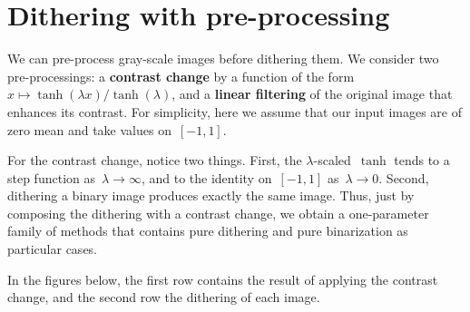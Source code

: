 
\section{Dithering with pre-processing}

We can pre-process gray-scale images before dithering them.  We consider two
pre-processings: a {\bf contrast change} by a function of the
form~$x\mapsto\tanh(\lambda x)/\tanh(\lambda)$, and a {\bf linear filtering}
of the original image that enhances its contrast.  For simplicity, here we
assume that our input images are of zero mean and take values on~$[-1,1]$.

For the contrast change, notice two things.  First, the
$\lambda$-scaled~$\tanh$ tends to a step function as~$\lambda\to\infty$, and
to the identity on~$[-1,1]$ as~$\lambda\to0$.
Second, dithering a binary image produces exactly the same image.  Thus, just
by composing the dithering with a contrast change, we obtain a one-parameter
family of methods that contains pure dithering and pure
binarization as particular cases.

In the figures below, the first row contains the result of applying the
contrast change, and the second row the dithering of each image.

